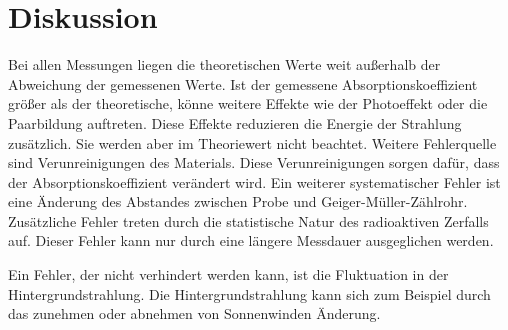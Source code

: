 \section{Diskussion}
\label{sec:Diskussion}

Bei allen Messungen liegen die theoretischen Werte weit außerhalb der Abweichung der gemessenen Werte. Ist der gemessene Absorptionskoeffizient größer als der theoretische, könne weitere Effekte wie der Photoeffekt oder die Paarbildung auftreten.
Diese Effekte reduzieren die Energie der Strahlung zusätzlich. Sie werden aber im Theoriewert nicht beachtet.
Weitere Fehlerquelle sind Verunreinigungen des Materials. Diese Verunreinigungen sorgen dafür, dass der Absorptionskoeffizient verändert wird.
Ein weiterer systematischer Fehler ist eine Änderung des Abstandes zwischen Probe und Geiger-Müller-Zählrohr.
Zusätzliche Fehler treten durch die statistische Natur des radioaktiven Zerfalls auf. Dieser Fehler kann nur durch eine längere Messdauer ausgeglichen werden.

Ein Fehler, der nicht verhindert werden kann, ist die Fluktuation in der Hintergrundstrahlung.
Die Hintergrundstrahlung kann sich zum Beispiel durch das zunehmen oder abnehmen von Sonnenwinden Änderung.